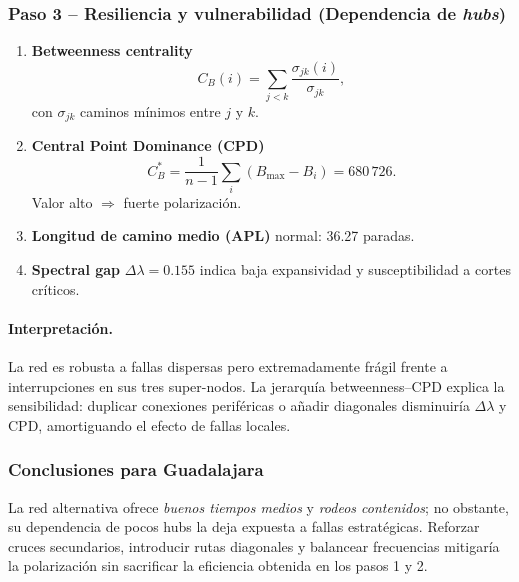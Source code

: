 \documentclass[11pt]{article}
\begin{document}
		\subsubsection*{Paso 3 – Resiliencia y vulnerabilidad (Dependencia de \textit{hubs})}
		\begin{enumerate}[label=\alph*)]
		\item \textbf{Betweenness centrality}
			  \[
			  C_B(i)=\sum_{j<k}\frac{\sigma_{jk}(i)}{\sigma_{jk}},
			  \]
			  con $\sigma_{jk}$ caminos mínimos entre $j$ y $k$.

		\item \textbf{Central Point Dominance (CPD)}
			  \[
			  C_B^{\ast}=\frac{1}{n-1}\sum_{i}(B_{\max}-B_i)=680\,726.
			  \]
			  Valor alto $\Rightarrow$ fuerte polarización.

		\item \textbf{Longitud de camino medio (APL)} normal: 36.27 paradas.

		\item \textbf{Spectral gap} $\Delta\lambda=0.155$ indica baja expansividad y susceptibilidad a cortes críticos.
		\end{enumerate}

		\paragraph{Interpretación.}
		La red es robusta a fallas dispersas pero extremadamente frágil frente a interrupciones en sus tres super-nodos. La jerarquía betweenness–CPD explica la sensibilidad: duplicar conexiones periféricas o añadir diagonales disminuiría $\Delta\lambda$ y CPD, amortiguando el efecto de fallas locales.

		\subsubsection*{Conclusiones para Guadalajara}
		La red alternativa ofrece \textit{buenos tiempos medios} y \textit{rodeos contenidos}; no obstante, su dependencia de pocos hubs la deja expuesta a fallas estratégicas. Reforzar cruces secundarios, introducir rutas diagonales y balancear frecuencias mitigaría la polarización sin sacrificar la eficiencia obtenida en los pasos 1 y 2.
\end{document}
